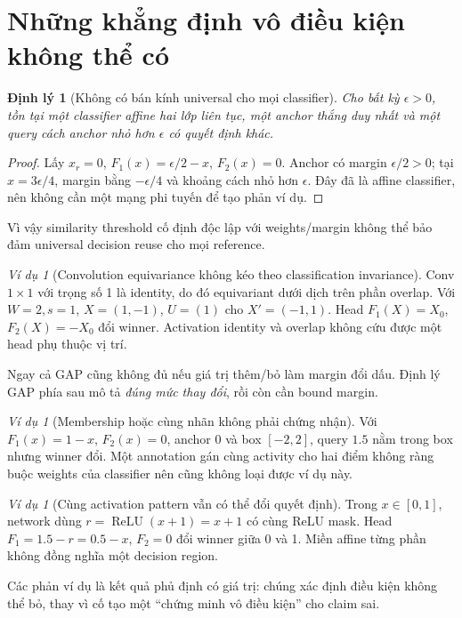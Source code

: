\documentclass[11pt,a4paper]{article}
\newcommand{\relu}{\operatorname{ReLU}}
\newtheorem{theorem}[definition]{Định lý}
\theoremstyle{remark}
\newtheorem{example}[definition]{Ví dụ}
\begin{document}
\section{Những khẳng định vô điều kiện không thể có}
\begin{theorem}[Không có bán kính universal cho mọi classifier]
Cho bất kỳ $\epsilon>0$, tồn tại một classifier affine hai lớp liên tục,
một anchor thắng duy nhất và một query cách anchor nhỏ hơn $\epsilon$ có
quyết định khác.
\end{theorem}
\begin{proof}
Lấy $x_r=0$, $F_1(x)=\epsilon/2-x$, $F_2(x)=0$. Anchor có margin
$\epsilon/2>0$; tại $x=3\epsilon/4$, margin bằng $-\epsilon/4$ và khoảng
cách nhỏ hơn $\epsilon$. Đây đã là affine classifier, nên không cần một
mạng phi tuyến để tạo phản ví dụ.
\end{proof}
Vì vậy similarity threshold cố định độc lập với weights/margin không thể
bảo đảm universal decision reuse cho mọi reference.

\begin{example}[Convolution equivariance không kéo theo classification invariance]
Conv $1\times1$ với trọng số 1 là identity, do đó equivariant dưới dịch trên
phần overlap. Với $W=2,s=1$, $X=(1,-1)$, $U=(1)$ cho $X'=(-1,1)$.
Head $F_1(X)=X_0$, $F_2(X)=-X_0$ đổi winner. Activation identity và overlap
không cứu được một head phụ thuộc vị trí.
\end{example}
Ngay cả GAP cũng không đủ nếu giá trị thêm/bỏ làm margin đổi dấu. Định lý
GAP phía sau mô tả \emph{đúng mức thay đổi}, rồi còn cần bound margin.

\begin{example}[Membership hoặc cùng nhãn không phải chứng nhận]
Với $F_1(x)=1-x$, $F_2(x)=0$, anchor 0 và box $[-2,2]$, query $1.5$ nằm
trong box nhưng winner đổi. Một annotation gán cùng activity cho hai điểm
không ràng buộc weights của classifier nên cũng không loại được ví dụ này.
\end{example}

\begin{example}[Cùng activation pattern vẫn có thể đổi quyết định]
Trong $x\in[0,1]$, network dùng $r=\relu(x+1)=x+1$ có cùng ReLU mask.
Head $F_1=1.5-r=0.5-x$, $F_2=0$ đổi winner giữa 0 và 1. Miền affine
từng phần \cite{montufar} không đồng nghĩa một decision region.
\end{example}
Các phản ví dụ là kết quả phủ định có giá trị: chúng xác định điều kiện
không thể bỏ, thay vì cố tạo một ``chứng minh vô điều kiện'' cho claim sai.
\end{document}
